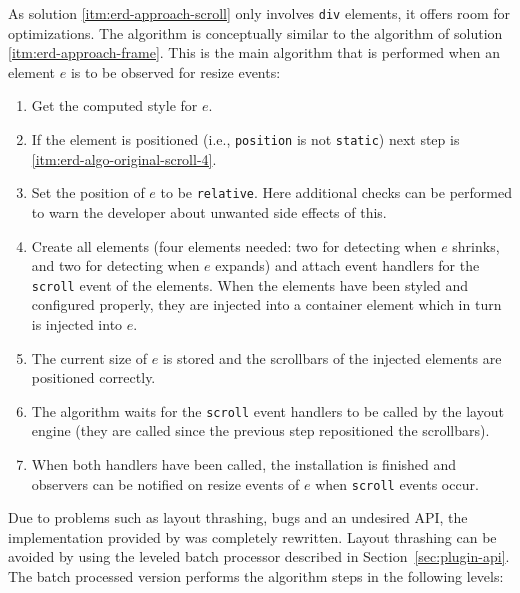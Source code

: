 \documentclass[a4paper,11pt]{kth-mag}
\newcommand{\code}[1]{\texttt{#1}}
\begin{document}
        As solution \ref{itm:erd-approach-scroll} only involves \code{div} elements, it offers room for optimizations.
        The algorithm is conceptually similar to the algorithm of solution \ref{itm:erd-approach-frame}.
        This is the main algorithm that is performed when an element $e$ is to be observed for resize events:
        \begin{enumerate}
          \item\label{itm:erd-algo-original-scroll-1} Get the computed style for $e$.
          \item\label{itm:erd-algo-original-scroll-2} If the element is positioned (i.e., \code{position} is not \code{static}) next step is \ref{itm:erd-algo-original-scroll-4}.
          \item\label{itm:erd-algo-original-scroll-3} Set the position of $e$ to be \code{relative}. Here additional checks can be performed to warn the developer about unwanted side effects of this.
          \item\label{itm:erd-algo-original-scroll-4} Create all elements (four elements needed: two for detecting when $e$ shrinks, and two for detecting when $e$ expands) and attach event handlers for the \code{scroll} event of the elements.
                                                      When the elements have been styled and configured properly, they are injected into a container element which in turn is injected into $e$.
          \item\label{itm:erd-algo-original-scroll-5} The current size of $e$ is stored and the scrollbars of the injected elements are positioned correctly.
          \item\label{itm:erd-algo-original-scroll-6} The algorithm waits for the \code{scroll} event handlers to be called by the layout engine (they are called since the previous step repositioned the scrollbars).
          \item\label{itm:erd-algo-original-scroll-7} When both handlers have been called, the installation is finished and observers can be notified on resize events of $e$ when \code{scroll} events occur.
        \end{enumerate}
        Due to problems such as layout thrashing, bugs and an undesired \gls{API}, the implementation provided by \cite{eq_imp_css-element-queries} was completely rewritten.
        Layout thrashing can be avoided by using the leveled batch processor described in Section~\ref{sec:plugin-api}.
        The batch processed version performs the algorithm steps in the following levels:
\end{document}
